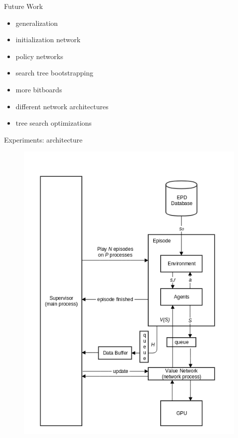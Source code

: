 \documentclass{beamer}
\begin{document}
\begin{frame}{Future Work}
\begin{itemize}
\item generalization
\item initialization network
\item policy networks
\item search tree bootstrapping
\item more bitboards
\item different network architectures
\item tree search optimizations
\end{itemize}
\end{frame}

\appendix

\begin{frame}{Experiments: architecture}
	\begin{figure}
		\includegraphics[scale=0.3]{fig/flow}
	\end{figure}
\end{frame}
\end{document}
